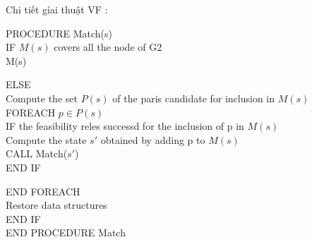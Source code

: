\documentclass[12pt]{report}
\newenvironment{thuattoan}[1][h]
  {\renewcommand{\algorithmcfname}{Thuật toán}
   \begin{algorithm}[#1]
  }{\end{algorithm}}
\begin{document}
\newpage
\noindent Chi tiết gỉai thuật VF \cite{vf2_1368}:
\begin{thuattoan}[!htbp]
	\label{algo:VF2}
	\caption{$VF2$}
	PROCEDURE Match(s)\\
	\hspace{5mm}
	\hspace{5mm}
	\hspace{5mm}IF $M(s)$ covers all the node of G2\\
		\hspace{10mm} \Return M(s)
		
	\hspace{5mm}ELSE\\
		\hspace{10mm} Compute the set $P(s)$ of the paris candidate for inclusion in $M(s)$\\
		\hspace{10mm} FOREACH	$p \in P(s)$ \\
		\hspace{10mm} IF the feasibility reles successd for the inclusion of p in $M(s)$\\
				\hspace{20mm} Compute the state $s'$ obtained by adding p to $M(s)$\\
				\hspace{20mm} CALL Match($s'$)\\
			
		\hspace{15mm} END IF
		
		\hspace{10mm}END FOREACH\\
		\hspace{10mm}Restore data structures\\
	\hspace{5mm}END IF\\
	END PROCEDURE Match
\end{thuattoan}
\end{document}
